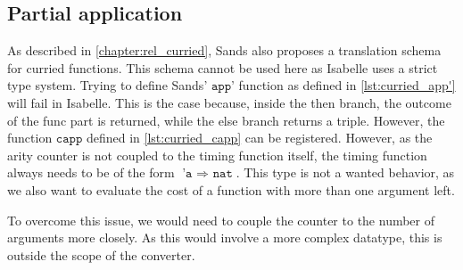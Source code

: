 \subsection{Partial application}
As described in \autoref{chapter:rel_curried}, Sands also proposes a translation schema for curried functions.
This schema cannot be used here as Isabelle uses a strict type system.
Trying to define Sands' $\texttt{app'}$ function as defined in \autoref{lst:curried_app'} will fail in Isabelle.
This is the case because, inside the then branch, the outcome of the func part is returned, while the else branch returns a triple.
However, the function $\texttt{capp}$ defined in \autoref{lst:curried_capp} can be registered.
However, as the arity counter is not coupled to the timing function itself, the timing function always needs to be of the form $\texttt{'a $\Rightarrow$ nat}$.
This type is not a wanted behavior, as we also want to evaluate the cost of a function with more than one argument left.

To overcome this issue, we would need to couple the counter to the number of arguments more closely.
As this would involve a more complex datatype, this is outside the scope of the converter.
